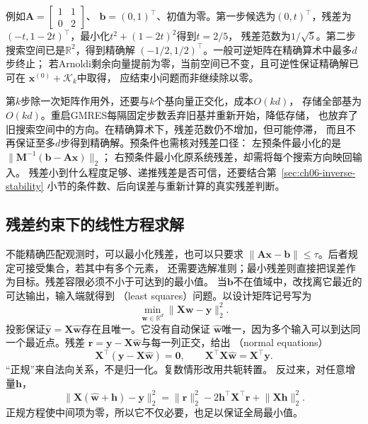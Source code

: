 例如$\bm A=\left[\begin{smallmatrix}1&1\\0&2\end{smallmatrix}\right]$、
$\bm b=(0,1)^\top$、初值为零。第一步候选为$(0,t)^\top$，残差为
$(-t,1-2t)^\top$，最小化$t^2+(1-2t)^2$得到$t=2/5$，
残差范数为$1/\sqrt5$。第二步搜索空间已是$\mathbb R^2$，得到精确解
$(-1/2,1/2)^\top$。一般可逆矩阵在精确算术中最多$d$步终止；
若Arnoldi剩余向量提前为零，当前空间已不变，且可逆性保证精确解已可在
$\bm x^{(0)}+\mathcal K_k$中取得，
应结束小问题而非继续除以零。

第$k$步除一次矩阵作用外，还要与$k$个基向量正交化，成本$O(kd)$，
存储全部基为$O(kd)$。重启GMRES每隔固定步数丢弃旧基并重新开始，降低存储，
也放弃了旧搜索空间中的方向。在精确算术下，残差范数仍不增加，但可能停滞，
而且不再保证至多$d$步得到精确解。预条件也需核对残差口径：
左预条件最小化的是$\lVert\bm M^{-1}(\bm b-\bm A\bm x)\rVert_2$；
右预条件最小化原系统残差，却需将每个搜索方向映回输入。
残差小到什么程度足够、递推残差是否可信，还要结合第~\ref{sec:ch06-inverse-stability}
小节的条件数、后向误差与重新计算的真实残差判断。

\subsection{残差约束下的线性方程求解}
\label{sec:linear-algebra-residual-systems}
\label{sec:linear-algebra-projection-least-squares}

\label{sec:matrix-analysis-inverse-input-selection}

不能精确匹配观测时，可以最小化残差，也可以只要求
$\lVert\bm A\bm x-\bm b\rVert\leq\tau$。后者规定可接受集合，若其中有多个元素，
还需要选解准则；最小残差则直接把误差作为目标。残差容限必须不小于可达到的最小值。
当$\bm b$不在值域中，改找离它最近的可达输出，输入端就得到
（least squares）问题。以设计矩阵记号写为
\begin{equation}
 \min_{\bm w\in\mathbb R^d}\lVert\bm X\bm w-\bm y\rVert_2^2.
 \label{eq:linear-algebra-least-squares}
\end{equation}
投影保证$\widehat{\bm y}=\bm X\widehat{\bm w}$存在且唯一。它没有自动保证
$\widehat{\bm w}$唯一，因为多个输入可以到达同一个最近点。残差
$\bm r=\bm y-\bm X\widehat{\bm w}$与每一列正交，给出
（normal equations）
\begin{equation}
 \bm X^\top(\bm y-\bm X\widehat{\bm w})=\bm0,
 \qquad
 \bm X^\top\bm X\widehat{\bm w}=\bm X^\top\bm y.
 \label{eq:linear-algebra-normal-equations}
\end{equation}
“正规”来自法向关系，不是归一化。复数情形改用共轭转置。
反过来，对任意增量$\bm h$，
\[
 \lVert\bm X(\widehat{\bm w}+\bm h)-\bm y\rVert_2^2
 =\lVert\bm r\rVert_2^2-2\bm h^\top\bm X^\top\bm r
  +\lVert\bm X\bm h\rVert_2^2.
\]
正规方程使中间项为零，所以它不仅必要，也足以保证全局最小值。


